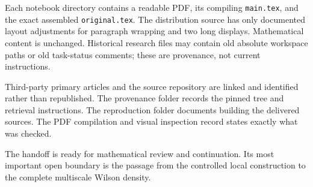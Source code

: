 \documentclass[11pt]{article}
\theoremstyle{remark}
\begin{document}
Each notebook directory contains a
readable PDF, its compiling
\texttt{main.tex}, and the exact
assembled \texttt{original.tex}.
The distribution source has only
documented layout adjustments for
paragraph wrapping and two long
displays. Mathematical content is
unchanged. Historical research files
may contain old absolute workspace
paths or old task-status comments;
these are provenance, not current
instructions.

Third-party primary articles and the
source repository are linked and
identified rather than republished.
The provenance folder records the
pinned tree and retrieval instructions.
The reproduction folder documents
building the delivered sources.
The PDF compilation and visual
inspection record states exactly
what was checked.

The handoff is ready for mathematical
review and continuation. Its most
important open boundary is the
passage from the controlled local
construction to the complete
multiscale Wilson density.
\end{document}
